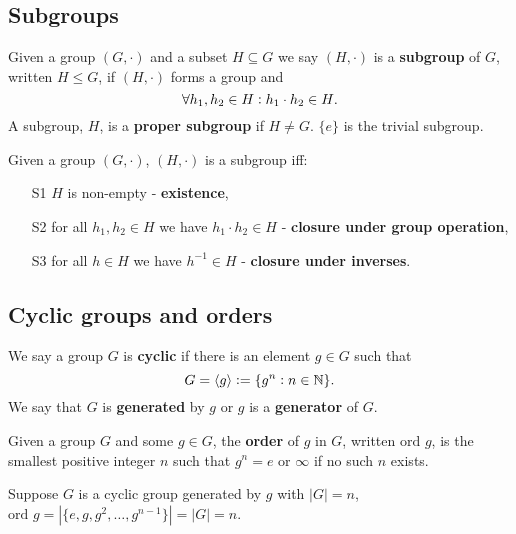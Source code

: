 \documentclass[../Year1/Year1.tex]{subfiles}
\begin{document}
\subsection{Subgroups}

\begin{definition}[Subgroup]
    Given a group $(G,\cdot)$ and a subset $H\subseteq G$ we say $(H,\cdot)$ is a \textbf{subgroup} of $G$, written $H\leq G$, if $(H,\cdot)$ forms a group and \[
    \forall h_1,h_2\in H: h_1\cdot h_2\in H
    \textcolor{black}{.}
    \]
    A subgroup, $H$, is a \textbf{proper subgroup} if $H\neq G$. $\{e\}$ is the trivial subgroup.
\end{definition}

\begin{theorem}
    Given a group $(G,\cdot)$, $(H,\cdot)$ is a subgroup iff: \begin{enumerate}
        \item[S1] $H$ is non-empty - \textbf{existence},
        \item[S2] for all $h_1,h_2\in H$ we have $h_1\cdot h_2\in H$ - \textbf{closure under group operation},
        \item[S3] for all $h\in H$ we have $h^{-1}\in H$ - \textbf{closure under inverses}.
    \end{enumerate}
\end{theorem}

\subsection{Cyclic groups and orders}

\begin{definition}
    We say a group $G$ is \textbf{cyclic} if there is an element $g\in G$ such that \[
    G = \left\langle g \right\rangle := \{g^n:n\in\mathbb{N}\} 
    \textcolor{black}{.}
    \]
    We say that $G$ is \textbf{generated} by $g$ or $g$ is a \textbf{generator} of $G$.
\end{definition}

\begin{definition}
    Given a group $G$ and some $g\in G$, the \textbf{order} of $g$ in $G$, written $\text{ord }g$, is the smallest positive integer $n$ such that $g^n = e$ or $\infty$ if no such $n$ exists.
\end{definition}

\begin{theorem}
    Suppose $G$ is a cyclic group generated by $g$ with $|G| = n$, $\text{ord }g = |\{e,g,g^2,\ldots,g^{n-1}\}| = |G| = n$.
\end{theorem}
\end{document}
